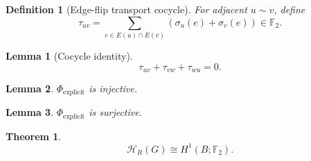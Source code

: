 \documentclass[11pt]{article}
\newtheorem{definition}{Definition}
\newtheorem{lemma}{Lemma}
\newtheorem{theorem}{Theorem}
\begin{document}
\begin{definition}[Edge-flip transport cocycle]
For adjacent $u\sim v$, define
\[
\tau_{uv} = \sum_{e\in E(u)\cap E(v)} (\sigma_u(e)+\sigma_v(e)) \in \mathbb F_2.
\]
\end{definition}

\begin{lemma}[Cocycle identity]
\[
\tau_{uv}+\tau_{vw}+\tau_{wu}=0.
\]
\end{lemma}

\begin{lemma}
$\Phi_{\mathrm{explicit}}$ is injective.
\end{lemma}

\begin{lemma}
$\Phi_{\mathrm{explicit}}$ is surjective.
\end{lemma}

\begin{theorem}
\[
\mathcal H_R(G)\cong H^1(B;\mathbb F_2).
\]
\end{theorem}
\end{document}
